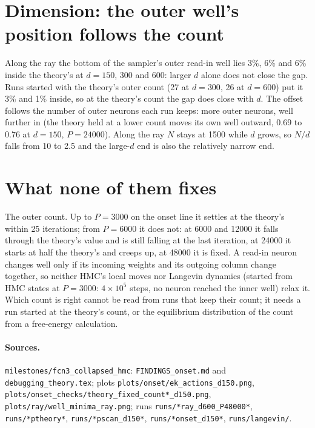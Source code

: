 \documentclass[11pt,a4paper]{article}
\begin{document}
\section*{Dimension: the outer well's position follows the count}

Along the ray the bottom of the sampler's outer read-in well lies 3\%, 6\% and 6\% inside the theory's at $d=150$, 300
and 600: larger $d$ alone does not close the gap. Runs started with the theory's outer count (27 at $d=300$, 26 at
$d=600$) put it 3\% and 1\% inside, so at the theory's count the gap does close with $d$. The offset follows the number
of outer neurons each run keeps: more outer neurons, well further in (the theory held at a lower count moves its own
well outward, 0.69 to 0.76 at $d=150$, $P=24000$). Along the ray $N$ stays at 1500 while $d$ grows, so $N/d$ falls
from 10 to 2.5 and the large-$d$ end is also the relatively narrow end.

\section*{What none of them fixes}

The outer count. Up to $P=3000$ on the onset line it settles at the theory's within 25 iterations; from $P=6000$ it
does not: at 6000 and 12000 it falls through the theory's value and is still falling at the last iteration, at 24000 it
starts at half the theory's and creeps up, at 48000 it is fixed. A read-in neuron changes well only if its incoming
weights and its outgoing column change together, so neither HMC's local moves nor Langevin dynamics (started from HMC
states at $P=3000$: $4\times10^5$ steps, no neuron reached the inner well) relax it. Which count is right cannot be
read from runs that keep their count; it needs a run started at the theory's count, or the equilibrium distribution
of the count from a free-energy calculation.

\paragraph{Sources.} \texttt{milestones/fcn3\_collapsed\_hmc}: \texttt{FINDINGS\_onset.md} and \texttt{debugging\_theory.tex};
plots \texttt{plots/onset/ek\_actions\_d150.png}, \texttt{plots/onset\_checks/theory\_fixed\_count*\_d150.png},
\texttt{plots/ray/well\_minima\_ray.png}; runs \texttt{runs/*ray\_d600\_P48000*}, \texttt{runs/*ptheory*},
\texttt{runs/*pscan\_d150*}, \texttt{runs/*onset\_d150*}, \texttt{runs/langevin/}.
\end{document}
